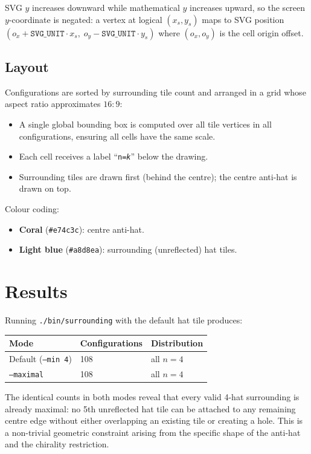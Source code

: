 \documentclass[10pt,a4paper]{article}
\let\polysection\section
\renewcommand\section{\needspace{0.16\textheight}\polysection}
\let\polysubsection\subsection
\renewcommand\subsection{\needspace{0.12\textheight}\polysubsection}
\newcommand{\code}[1]{\texttt{\small #1}}
\begin{document}
SVG $y$ increases downward while mathematical $y$ increases upward, so
the screen $y$-coordinate is negated: a vertex at logical $(x_s, y_s)$
maps to SVG position $(o_x + \texttt{SVG\_UNIT}\cdot x_s,\;
o_y - \texttt{SVG\_UNIT}\cdot y_s)$ where $(o_x, o_y)$ is the cell
origin offset.

\subsection{Layout}

Configurations are sorted by surrounding tile count and arranged in a
grid whose aspect ratio approximates $16{:}9$:
\begin{itemize}
  \item A single global bounding box is computed over all tile vertices
    in all configurations, ensuring all cells have the same scale.
  \item Each cell receives a label ``\code{n=\textit{k}}'' below the
    drawing.
  \item Surrounding tiles are drawn first (behind the centre); the
    centre anti-hat is drawn on top.
\end{itemize}

Colour coding:
\begin{itemize}
  \item \textbf{\color{hatred}Coral} (\texttt{\#e74c3c}): centre
    anti-hat.
  \item \textbf{\color{hatblue}Light blue} (\texttt{\#a8d8ea}):
    surrounding (unreflected) hat tiles.
\end{itemize}

\section{Results}

Running \code{./bin/surrounding} with the default hat tile produces:

\medskip
\begin{tabular}{@{}lll@{}}
\toprule
\textbf{Mode} & \textbf{Configurations} & \textbf{Distribution} \\
\midrule
Default (\code{--min 4})  & 108 & all $n = 4$ \\
\code{--maximal}          & 108 & all $n = 4$ \\
\bottomrule
\end{tabular}

\medskip
\noindent The identical counts in both modes reveal that every valid
4-hat surrounding is already maximal: no 5th unreflected hat tile can
be attached to any remaining centre edge without either overlapping an
existing tile or creating a hole.  This is a non-trivial geometric
constraint arising from the specific shape of the anti-hat and the
chirality restriction.
\end{document}
